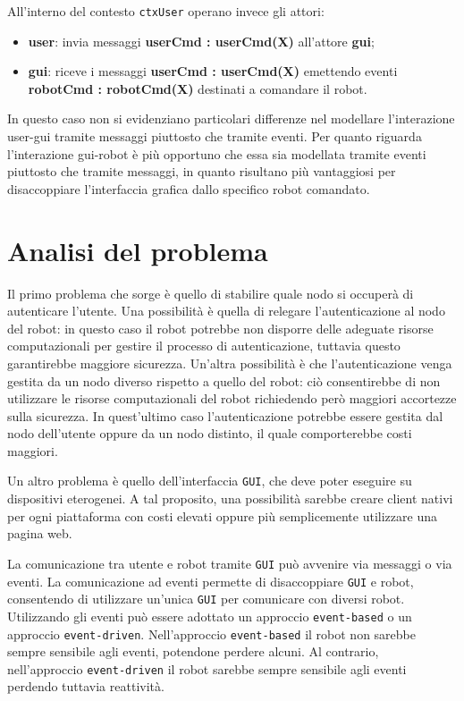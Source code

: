 \documentclass{llncs}
\newcommand{\action}[1]{\texttt{#1}\xspace}
\newcommand{\code}[1]{{\color{blue}\small{\texttt{#1}}}}
\newcommand{\labelsec}[1]{\label{sec:#1}}
\begin{document}
All'interno del contesto \action{ctxUser} operano invece gli attori:
\begin{itemize}
	\item \textbf{user}: invia messaggi \textbf{userCmd : userCmd(X)} all'attore \textbf{gui};
	\item \textbf{gui}: riceve i messaggi \textbf{userCmd : userCmd(X)} emettendo eventi \textbf{robotCmd : robotCmd(X)} destinati a comandare il robot.
\end{itemize}
In questo caso non si evidenziano particolari differenze nel modellare l'interazione user-gui tramite messaggi piuttosto che tramite eventi. 
Per quanto riguarda l'interazione gui-robot è più opportuno che essa sia modellata tramite eventi piuttosto che tramite messaggi, in quanto risultano più vantaggiosi per disaccoppiare l'interfaccia grafica dallo specifico robot comandato. 


\section{Analisi del problema}
\labelsec{ProblemAnalysis}
Il primo problema che sorge è quello di stabilire quale nodo si occuperà di autenticare l'utente. Una possibilità è quella di relegare l'autenticazione al nodo del robot: in questo caso il robot potrebbe non disporre delle adeguate risorse computazionali per gestire il processo di autenticazione, tuttavia questo garantirebbe maggiore sicurezza. Un'altra possibilità è che l'autenticazione venga gestita da un nodo diverso rispetto a quello del robot: ciò consentirebbe di non utilizzare le risorse computazionali del robot richiedendo però maggiori accortezze sulla sicurezza. In quest'ultimo caso l'autenticazione potrebbe essere gestita dal nodo dell'utente oppure da un nodo distinto, il quale comporterebbe costi maggiori.

Un altro problema è quello dell'interfaccia \action{GUI}, che deve poter eseguire su dispositivi eterogenei. A tal proposito, una possibilità sarebbe creare client nativi per ogni piattaforma con costi elevati oppure più semplicemente utilizzare una pagina web. 

La comunicazione tra utente e robot tramite \action{GUI} può avvenire via messaggi o via eventi. La comunicazione ad eventi permette di disaccoppiare \action{GUI} e robot, consentendo di utilizzare un'unica \action{GUI} per comunicare con diversi robot. Utilizzando gli eventi può essere adottato un approccio \code{event-based} o un approccio \code{event-driven}. Nell'approccio \code{event-based} il robot non sarebbe sempre sensibile agli eventi, potendone perdere alcuni. Al contrario, nell'approccio \code{event-driven} il robot sarebbe sempre sensibile agli eventi perdendo tuttavia reattività.
\end{document}
